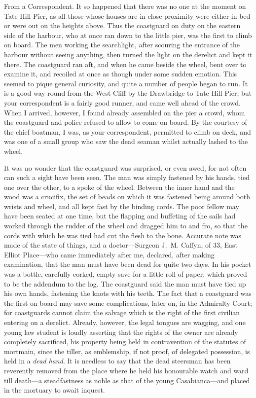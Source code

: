 \begin{newspaper}{}{From a Correspondent.}
It so happened that there was no one at the moment on Tate Hill Pier, as all those whose houses are in close proximity were either in bed or were out on the heights above. Thus the coastguard on duty on the eastern side of the harbour, who at once ran down to the little pier, was the first to climb on board. The men working the searchlight, after scouring the entrance of the harbour without seeing anything, then turned the light on the derelict and kept it there. The coastguard ran aft, and when he came beside the wheel, bent over to examine it, and recoiled at once as though under some sudden emotion. This seemed to pique general curiosity, and quite a number of people began to run. It is a good way round from the West Cliff by the Drawbridge to Tate Hill Pier, but your correspondent is a fairly good runner, and came well ahead of the crowd. When I arrived, however, I found already assembled on the pier a crowd, whom the coastguard and police refused to allow to come on board. By the courtesy of the chief boatman, I was, as your correspondent, permitted to climb on deck, and was one of a small group who saw the dead seaman whilst actually lashed to the wheel.

It was no wonder that the coastguard was surprised, or even awed, for not often can such a sight have been seen. The man was simply fastened by his hands, tied one over the other, to a spoke of the wheel. Between the inner hand and the wood was a crucifix, the set of beads on which it was fastened being around both wrists and wheel, and all kept fast by the binding cords. The poor fellow may have been seated at one time, but the flapping and buffeting of the sails had worked through the rudder of the wheel and dragged him to and fro, so that the cords with which he was tied had cut the flesh to the bone. Accurate note was made of the state of things, and a doctor—Surgeon J\@.~M\@. Caffyn, of 33, East Elliot Place—who came immediately after me, declared, after making examination, that the man must have been dead for quite two days. In his pocket was a bottle, carefully corked, empty save for a little roll of paper, which proved to be the addendum to the log. The coastguard said the man must have tied up his own hands, fastening the knots with his teeth. The fact that a coastguard was the first on board may save some complications, later on, in the Admiralty Court; for coastguards cannot claim the salvage which is the right of the first civilian entering on a derelict. Already, however, the legal tongues are wagging, and one young law student is loudly asserting that the rights of the owner are already completely sacrificed, his property being held in contravention of the statutes of mortmain, since the tiller, as emblemship, if not proof, of delegated possession, is held in a \textit{dead hand}. It is needless to say that the dead steersman has been reverently removed from the place where he held his honourable watch and ward till death—a steadfastness as noble as that of the young Casabianca—and placed in the mortuary to await inquest.


\end{newspaper}
